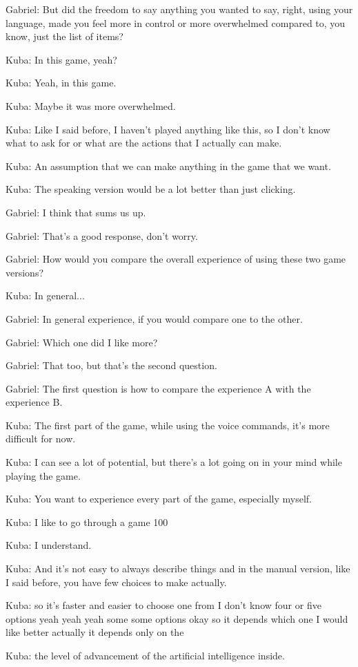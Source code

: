 Gabriel: But did the freedom to say anything you wanted to say, right, using your language, made you feel more in control or more overwhelmed compared to, you know, just the list of items?

Kuba: In this game, yeah?

Kuba: Yeah, in this game.

Kuba: Maybe it was more overwhelmed.

Kuba: Like I said before, I haven't played anything like this, so I don't know what to ask for or what are the actions that I actually can make.

Kuba: An assumption that we can make anything in the game that we want.

Kuba: The speaking version would be a lot better than just clicking.

Gabriel: I think that sums us up.

Gabriel: That's a good response, don't worry.

Gabriel: How would you compare the overall experience of using these two game versions?

Kuba: In general...

Gabriel: In general experience, if you would compare one to the other.

Gabriel: Which one did I like more?

Gabriel: That too, but that's the second question.

Gabriel: The first question is how to compare the experience A with the experience B.

Kuba: The first part of the game, while using the voice commands, it's more difficult for now.

Kuba: I can see a lot of potential, but there's a lot going on in your mind while playing the game.

Kuba: You want to experience every part of the game, especially myself.

Kuba: I like to go through a game 100%

Kuba: I understand.

Kuba: And it's not easy to always describe things and in the manual version, like I said before, you have few choices to make actually.

Kuba: so it's faster and easier to choose one from I don't know four or five options yeah yeah yeah some some options okay so it depends which one I would like better actually it depends only on the

Kuba: the level of advancement of the artificial intelligence inside.

